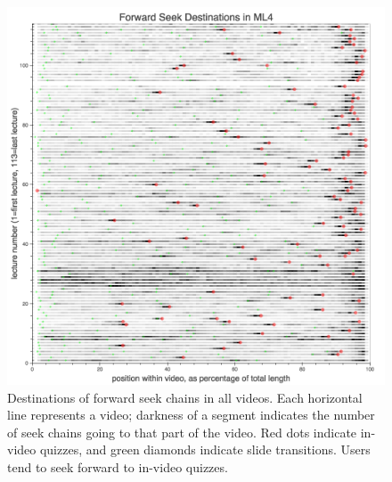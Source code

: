 \documentclass{sigchi}
\begin{document}



\begin{figure}
\includegraphics[width=1.0\columnwidth]{forward-seek-destinations-allvideos}
\caption{Destinations of forward seek chains in all videos. Each horizontal line represents a video; darkness of a segment indicates the number of seek chains going to that part of the video. Red dots indicate in-video quizzes, and green diamonds indicate slide transitions. Users tend to seek forward to in-video quizzes.}
\label{fig:forward-seek-destinations-allvideos}
\end{figure}
\end{document}
